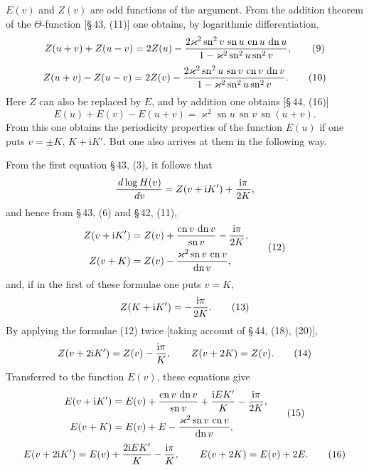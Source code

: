 \documentclass[11pt]{article}
\providecommand{\dd}{\,d}
\providecommand{\sn}{\operatorname{sn}}
\providecommand{\cn}{\operatorname{cn}}
\providecommand{\dn}{\operatorname{dn}}
\providecommand{\ii}{\mathrm{i}}
\begin{document}
$E(v)$ and $Z(v)$ are odd functions of the argument. From the addition theorem of the $\Theta$-function [\S\,43, (11)] one obtains, by logarithmic differentiation,
\begin{equation}
Z(u+v)+Z(u-v)=2Z(u)-{2\varkappa^2\sn^2v\,\sn u\,\cn u\,\dn u\over1-\varkappa^2\sn^2u\sn^2v},
\tag{9}
\end{equation}
\begin{equation}
Z(u+v)-Z(u-v)=2Z(v)-{2\varkappa^2\sn^2u\,\sn v\,\cn v\,\dn v\over1-\varkappa^2\sn^2u\sn^2v}.
\tag{10}
\end{equation}
Here $Z$ can also be replaced by $E$, and by addition one obtains [\S\,44, (16)]
\begin{equation}
E(u)+E(v)-E(u+v)=\varkappa^2\sn u\,\sn v\,\sn(u+v).
\tag{11}
\end{equation}
From this one obtains the periodicity properties of the function $E(u)$ if one puts $v=\pm K$, $K+\ii K'$. But one also arrives at them in the following way.

From the first equation \S\,43, (3), it follows that
\[
{\dd\log H(v)\over\dd v}=Z(v+\ii K')+{\ii\pi\over2K},
\]
and hence from \S\,43, (6) and \S\,42, (11),
\begin{equation}
\begin{aligned}
Z(v+\ii K')&=Z(v)+{\cn v\,\dn v\over\sn v}-{\ii\pi\over2K},\\
Z(v+K)&=Z(v)-{\varkappa^2\sn v\,\cn v\over\dn v},
\end{aligned}
\tag{12}
\end{equation}
and, if in the first of these formulae one puts $v=K$,
\begin{equation}
Z(K+\ii K')=-{\ii\pi\over2K}.
\tag{13}
\end{equation}
By applying the formulae (12) twice [taking account of \S\,44, (18), (20)],
\begin{equation}
Z(v+2\ii K')=Z(v)-{\ii\pi\over K},
\qquad
Z(v+2K)=Z(v).
\tag{14}
\end{equation}
Transferred to the function $E(v)$, these equations give
\begin{equation}
\begin{aligned}
E(v+\ii K')&=E(v)+{\cn v\,\dn v\over\sn v}+{\ii E K'\over K}-{\ii\pi\over2K},\\
E(v+K)&=E(v)+E-{\varkappa^2\sn v\,\cn v\over\dn v},
\end{aligned}
\tag{15}
\end{equation}
\begin{equation}
E(v+2\ii K')=E(v)+{2\ii E K'\over K}-{\ii\pi\over K},
\qquad
E(v+2K)=E(v)+2E.
\tag{16}
\end{equation}
\end{document}
